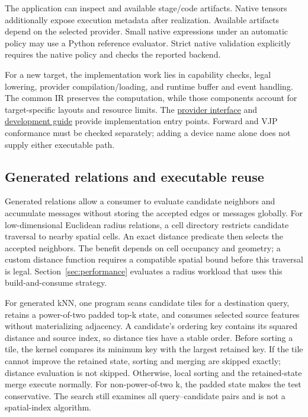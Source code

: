 The application can inspect  and available stage/code
artifacts. Native tensors additionally expose execution metadata after
realization. Available artifacts depend on the selected provider.
Small native expressions under an automatic policy may use a
Python reference evaluator. Strict native validation explicitly requires the
native policy and checks the reported backend.

For a new target, the implementation work lies in capability checks, legal
lowering, provider compilation/loading, and runtime buffer and event handling.
The common IR preserves the computation, while those components account for
target-specific layouts and resource limits. The
\href{https://github.com/walkerchi/TIGA-lang/blob/main/python/tiga/codegen/registry.py}{provider interface}
and \href{https://walkerchi.github.io/TIGA-lang/development/}{development guide}
provide implementation entry points. Forward and VJP conformance must be checked
separately; adding a device name alone does not supply either executable path.

\subsection{Generated relations and executable reuse}
Generated relations allow a consumer to evaluate candidate neighbors and
accumulate messages without storing the accepted edges or messages globally.
For low-dimensional Euclidean radius relations, a cell directory restricts
candidate traversal to nearby spatial cells. An exact distance predicate then
selects the accepted neighbors. The benefit depends on cell occupancy and
geometry; a custom distance function requires a compatible spatial bound before
this traversal is legal. Section~\ref{sec:performance} evaluates a radius workload
that uses this build-and-consume strategy.

For generated kNN, one program scans candidate tiles for a destination query,
retains a power-of-two padded top-k state, and consumes selected source features
without materializing adjacency. A candidate's ordering key contains its squared
distance and source index, so distance ties have a stable order. Before sorting
a tile, the kernel compares its minimum key with the largest retained key.
If the tile cannot improve the retained state, sorting and merging are skipped
exactly; distance evaluation is not skipped. Otherwise, local sorting and the
retained-state merge execute normally. For non-power-of-two k, the padded state
makes the test conservative. The search still examines all query--candidate
pairs and is not a spatial-index algorithm.

